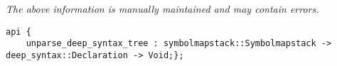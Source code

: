 \label{pkg:print\_hooks}

{\tiny \it The above information is manually maintained and may contain errors.}
\begin{verbatim}
api {
    unparse_deep_syntax_tree : symbolmapstack::Symbolmapstack -> deep_syntax::Declaration -> Void;};
\end{verbatim}
